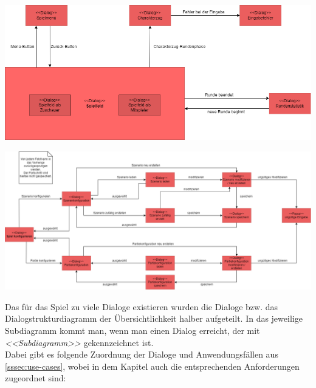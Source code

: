 \documentclass[12pt]{article}
\begin{document}
\includegraphics[width=\textwidth]{images/meilen3_a1_Spielfeld}


\includegraphics[width=\textwidth]{images/meilen3_a1_Spielkonfiguration}

Das für das Spiel zu viele Dialoge existieren wurden die Dialoge bzw. das Dialogstrukturdiagramm der Übersichtlichkeit halber aufgeteilt. In das jeweilige Subdiagramm kommt man, wenn man einen Dialog erreicht, der mit \textit{<<Subdiagramm>>} gekennzeichnet ist. \\ Dabei gibt es folgende Zuordnung der Dialoge und Anwendungsfällen aus \autoref{sssec:use-cases}, wobei in dem Kapitel auch die entsprechenden Anforderungen zugeordnet sind: 

\vspace{0.5cm}
\end{document}
